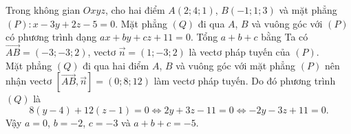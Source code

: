 \begin{ex}%
	Trong không gian $Oxyz$, cho hai điểm $A(2;4;1)$, $B(-1;1;3)$ và mặt phẳng $(P)\colon x-3y+2z-5=0$. Mặt phẳng $(Q)$ đi qua $A$, $B$ và vuông góc với $(P)$ có phương trình dạng $ax+by+cz+11=0$. Tổng $a+b+c$ bằng
	\loigiai
	{Ta có $\overrightarrow{AB}=(-3;-3;2)$, vectơ $\overrightarrow{n}=(1;-3;2)$ là vectơ pháp tuyến của $(P)$.\\
		Mặt phẳng $(Q)$ đi qua hai điểm $A$, $B$ và vuông góc với mặt phẳng $(P)$ nên nhận vectơ $\left[\overrightarrow{AB}, \overrightarrow{n}\right] = (0;8;12)$ làm vectơ pháp tuyến. Do đó phương trình $(Q)$ là
		$$8(y-4)+12(z-1)=0 \Leftrightarrow 2y+3z-11=0 \Leftrightarrow -2y-3z+11=0.$$
		Vậy $a=0$, $b=-2$, $c=-3$ và $a+b+c=-5$.}
\end{ex}


